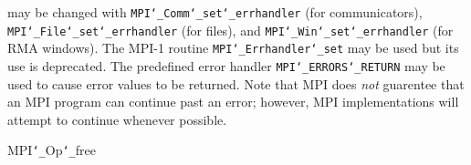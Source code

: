 may be changed with {\tt MPI{\tt \char`\_}Comm{\tt \char`\_}set{\tt \char`\_}errhandler} (for communicators),
{\tt MPI{\tt \char`\_}File{\tt \char`\_}set{\tt \char`\_}errhandler} (for files), and {\tt MPI{\tt \char`\_}Win{\tt \char`\_}set{\tt \char`\_}errhandler} (for
RMA windows).  The MPI-1 routine {\tt MPI{\tt \char`\_}Errhandler{\tt \char`\_}set} may be used but
its use is deprecated.  The predefined error handler
{\tt MPI{\tt \char`\_}ERRORS{\tt \char`\_}RETURN} may be used to cause error values to be returned.
Note that MPI does {\em not} guarentee that an MPI program can continue past
an error; however, MPI implementations will attempt to continue whenever
possible.
\par
{}
\par
{}
 MPI{\tt \char`\_}Op{\tt \char`\_}free
\nextline
{}
\endmanpage
